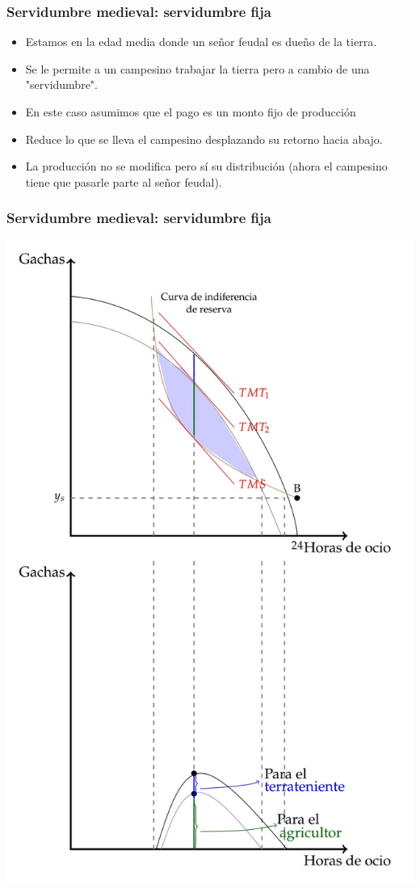 \documentclass{beamer}
\begin{document}
\begin{frame}
\frametitle{Servidumbre medieval: servidumbre fija }
\begin{itemize}
    \item Estamos en la edad media donde un señor feudal es dueño de la tierra. 
\item Se le permite a un campesino trabajar la tierra pero a cambio de una "servidumbre". 
    \item  En este caso asumimos que el pago es un monto fijo de producción 
    \item Reduce lo que se lleva el campesino desplazando su retorno hacia abajo.
    \item La producción no se modifica pero sí su distribución (ahora el campesino tiene que pasarle parte al señor feudal). 
\end{itemize}
\end{frame}

\begin{frame}
\frametitle{Servidumbre medieval: servidumbre fija }
\centering
\includegraphics[scale=0.55]{../Figures/Instituciones3.jpg}
\end{frame}
\end{document}
